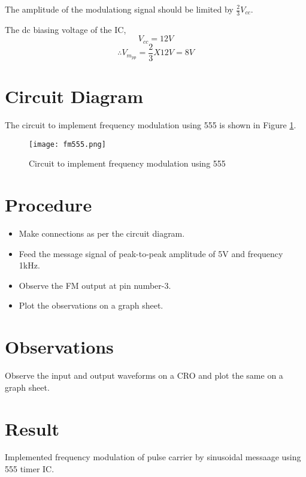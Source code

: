 The amplitude of the modulationg signal should be limited by $\frac{2}{3}V_{cc}$.

The dc biasing voltage of the IC, 
\begin{equation}
V_{cc}=12 V
\end{equation}
\begin{equation}
\therefore V_{m_{pp}}=\frac{2}{3}X12 V=8V
\end{equation}
\section*{Circuit Diagram}
The circuit to implement frequency modulation using 555 is shown in Figure \ref{fm555ckt}.

\begin{figure}
\texttt{[image: fm555.png]}
\caption{Circuit to implement frequency modulation using 555}
\label{fm555ckt}
\end{figure}

\section*{Procedure}

\begin{itemize}
\item
Make connections as per the circuit diagram.

\item

Feed the message signal of peak-to-peak amplitude of 5V and frequency 1kHz.
\item Observe the FM output at pin number-3.

\item
Plot the observations on a graph sheet.
\end{itemize}


\section*{Observations}
Observe the input and output waveforms on a CRO and plot the same on a graph sheet.
\section*{Result}
Implemented frequency modulation of pulse carrier by sinusoidal messaage using 555 timer IC.




